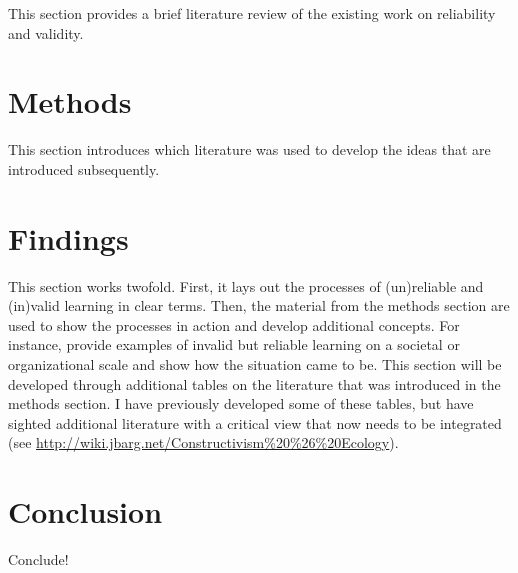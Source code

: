 \documentclass{article}
\begin{document}
	This section provides a brief literature review of the existing work on reliability and validity.

	\section*{Methods}

	This section introduces which literature was used to develop the ideas that are introduced subsequently.

	\section*{Findings}

	This section works twofold. First, it lays out the processes of (un)reliable and (in)valid learning in clear terms. Then, the material from the methods section are used to show the processes in action and develop additional concepts. For instance, provide examples of invalid but reliable learning on a societal or organizational scale and show how the situation came to be. This section will be developed through additional tables on the literature that was introduced in the methods section. I have previously developed some of these tables, but have sighted additional literature with a critical view that now needs to be integrated (see \url{http://wiki.jbarg.net/Constructivism%20%26%20Ecology}).

	\section*{Conclusion}

	Conclude!

	\clearpage
	
	
\end{document}

